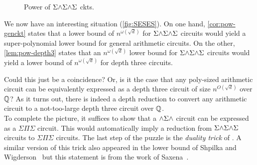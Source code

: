 \begin{figure}
\begin{center}
\end{center}
\caption{Power of $\Sigma\mathord{\wedge}\Sigma\mathord{\wedge}\Sigma$ ckts.}
\label{fig:SESES}
\end{figure}


We now have an interesting situation (\autoref{fig:SESES}).
On one hand, \autoref{cor:pow-genckt} states that a lower bound of
$n^{\omega(\sqrt{d})}$ for $\Sigma\mathord{\wedge}\Sigma\mathord{\wedge}\Sigma$ circuits would yield a
super-polynomial lower bound for general arithmetic circuits.
On the other, \autoref{lem:pow-depth3} states that an
$n^{\omega(\sqrt{d})}$ lower bound for $\Sigma\mathord{\wedge}\Sigma\mathord{\wedge}\Sigma$ circuits would yield a
lower bound of $n^{\omega(\sqrt{d})}$ for depth three circuits. 

Could this just be a coincidence? 
Or, is it the case that any
poly-sized arithmetic circuit can be equivalently expressed as a depth
three circuit of size $n^{O(\sqrt{d})}$ over $\mathbb{Q}$? 
As it turns out,
there is indeed a depth reduction to convert any arithmetic circuit to
a not-too-large depth three circuit over $\mathbb{Q}$. \\

To complete the picture, it suffices to show that a
$\mathord{\wedge}\Sigma\mathord{\wedge}$ circuit can be expressed as a
$\Sigma\Pi\Sigma$ circuit.
This would automatically imply a reduction from $\Sigma\mathord{\wedge}\Sigma\mathord{\wedge}\Sigma$ circuits to
$\Sigma\Pi\Sigma$ circuits.
The last step of the puzzle is the \emph{duality trick} of
\cite{sax08}. 
A similar version of this trick also appeared in the lower bound of Shpilka and Wigderson~\cite{sw2001} but this statement is from the work of Saxena~\cite{sax08}.

